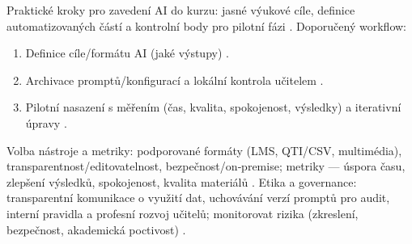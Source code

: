 Praktické kroky pro zavedení AI do kurzu: jasné výukové cíle, definice automatizovaných částí a kontrolní body pro pilotní fázi \cite{node_2-5}.
Doporučený workflow: \begin{enumerate}
\item Definice cíle/formátu AI (jaké výstupy) \cite{node_2-5}.
\item Archivace promptů/konfigurací a lokální kontrola učitelem \cite{node_2-5}.
\item Pilotní nasazení s měřením (čas, kvalita, spokojenost, výsledky) a iterativní úpravy \cite{node_2-5}.
\end{enumerate}
Volba nástroje a metriky: podporované formáty (LMS, QTI/CSV, multimédia), transparentnost/editovatelnost, bezpečnost/on‑premise; metriky — úspora času, zlepšení výsledků, spokojenost, kvalita materiálů \cite{node_2-5}.
Etika a governance: transparentní komunikace o využití dat, uchovávání verzí promptů pro audit, interní pravidla a profesní rozvoj učitelů; monitorovat rizika (zkreslení, bezpečnost, akademická poctivost) \cite{node_2-5}.